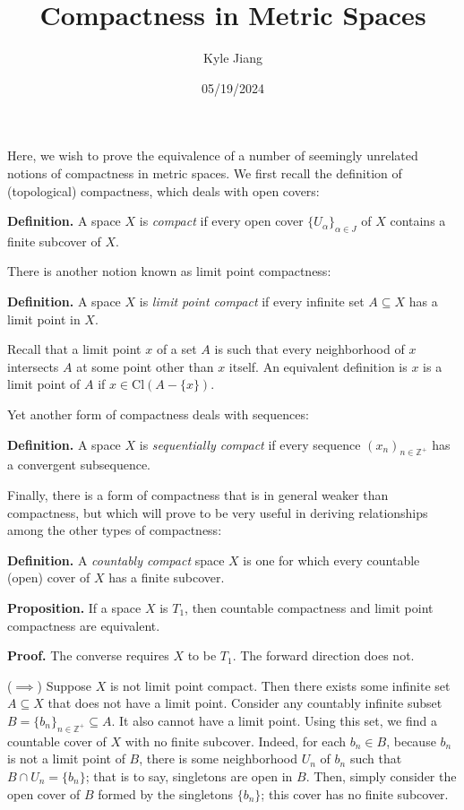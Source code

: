 \documentclass[12pt]{article}
\title{Compactness in Metric Spaces}
\author{Kyle Jiang}
\date{05/19/2024}
\begin{document}
\maketitle


Here, we wish to prove the equivalence of a number of seemingly unrelated notions of compactness in metric spaces. We first recall the definition of (topological) compactness, which deals with open covers:

\textbf{Definition. } A space $X$ is \emph{compact} if every open cover $\{ U_\alpha \}_{\alpha \in J}$ of $X$ contains a finite subcover of $X$.

\vspace{1 \baselineskip}

There is another notion known as limit point compactness:

\textbf{Definition. } A space $X$ is \emph{limit point compact} if every infinite set $A \subseteq X$ has a limit point in $X$.

Recall that a limit point $x$ of a set $A$ is such that every neighborhood of $x$ intersects $A$ at some point other than $x$ itself. An equivalent definition is $x$ is a limit point of $A$ if $x \in \text{Cl} (A - \{ x \})$.

\vspace{1 \baselineskip}

Yet another form of compactness deals with sequences:

\textbf{Definition. } A space $X$ is \emph{sequentially compact} if every sequence $(x_n)_{n \in \mathbb{Z}^+}$ has a convergent subsequence.

\vspace{1 \baselineskip}

Finally, there is a form of compactness that is in general weaker than compactness, but which will prove to be very useful in deriving relationships among the other types of compactness:

\textbf{Definition. } A \emph{countably compact} space $X$ is one for which every countable (open) cover of $X$ has a finite subcover.


\vspace{2 \baselineskip}


\textbf{Proposition. } If a space $X$ is $T_1$, then countable compactness and limit point compactness are equivalent.

\textbf{Proof. } The converse requires $X$ to be $T_1$. The forward direction does not.

($\implies$) Suppose $X$ is not limit point compact. Then there exists some infinite set $A \subseteq X$ that does not have a limit point. Consider any countably infinite subset $B = \{ b_n \}_{n \in \mathbb{Z}^+} \subseteq A$. It also cannot have a limit point. Using this set, we find a countable cover of $X$ with no finite subcover. Indeed, for each $b_n \in B$, because $b_n$ is not a limit point of $B$, there is some neighborhood $U_n$ of $b_n$ such that $B \cap U_n = \{ b_n \}$; that is to say, singletons are open in $B$. Then, simply consider the open cover of $B$ formed by the singletons $\{ b_n \}$; this cover has no finite subcover.
\end{document}
